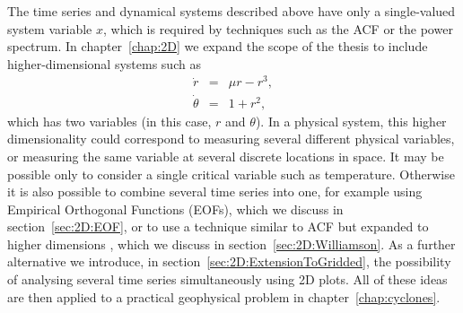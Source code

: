 The time series and dynamical systems described above have only a single-valued system variable $x$, which is required by techniques such as the ACF or the power spectrum. In chapter~\ref{chap:2D} we expand the scope of the thesis to include higher-dimensional systems such as
	\begin{equation}
		\begin{array}{rcl}
		\dot{r} &=& \mu r - r^3,\\
		\dot{\theta} &=& 1 + r^2,
		\end{array}
	\label{eqn:intro:HopfSystem}
	\end{equation}
which has two variables (in this case, $r$ and $\theta$). In a physical system, {\Red this higher dimensionality} could correspond to measuring several different physical variables, or measuring the same variable at several discrete locations in space. It may be possible only to consider a single critical variable such as temperature. Otherwise it is also possible to combine several time series into one, for example using Empirical Orthogonal Functions (EOFs), which we discuss in section~\ref{sec:2D:EOF}, or to use a technique similar to ACF but expanded to higher dimensions \citep{williamson2015}, which we discuss in section~\ref{sec:2D:Williamson}. As a further alternative we introduce, in section~\ref{sec:2D:ExtensionToGridded}, the possibility of analysing several time series simultaneously using 2D plots. All of these ideas are then applied to a practical geophysical problem in chapter~\ref{chap:cyclones}.






